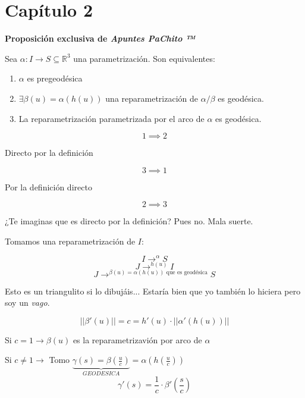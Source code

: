 \documentclass[openany]{book}
\begin{document}
\chapter{Capítulo 2}

\begin{proposition}
  { \color{turquoise} \textbf{Proposición exclusiva de \textit{Apuntes PaChito ™}}}

  Sea $\alpha : I \to S \subseteq \mathbb{R}^{ 3 } $ una parametrización. Son equivalentes:

  \begin{enumerate}
    \item $\alpha$ es pregeodésica
    \item $\exists \beta (u) = \alpha (h(u))$ una reparametrización de $\alpha /\beta $ es geodésica.
    \item La reparametrización parametrizada por el arco de $\alpha $ es geodésica.
  \end{enumerate}
\end{proposition}
\begin{demonstration}
  $$ 1 \implies 2 $$

  Directo por la definición

  $$ 3 \implies 1 $$

  Por la definición directo

  $$ 2 \implies 3 $$

  ¿Te imaginas que es directo por la definición? Pues no. Mala suerte.

  Tomamos una reparametrización de $I$:

  $$ I \to^\alpha S $$
  $$ J \to^{h(u)} I $$
  $$ J \to^{\beta (u) = \alpha (h(u)) \text{ que es geodésica}} S $$

  Esto es un triangulito si lo dibujáis... Estaría bien que yo también lo hiciera pero soy un \textit{vago}.

  $$ ||\beta '(u)||= c = h'(u) \cdot ||\alpha '(h(u))|| $$

  Si $c=1 \to \beta (u)$ es la reparametrizavión por arco de $\alpha $

  Si $c \ne 1 \to $ Tomo $\underbrace{ \gamma (s) = \beta(\frac{u}{c}) }_{ GEODESICA } = \alpha (h(\frac{u}{c}))$
  $$ \gamma '(s) = \dfrac{1}{c} \cdot  \beta'\left(\frac{s}{c}\right) $$
\end{demonstration}
\end{document}
